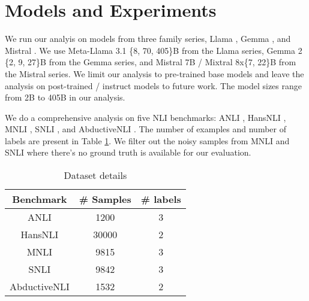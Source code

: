 \section{Models and Experiments}

We run our analyis on models from three family series, Llama \citep{dubey2024llama}, Gemma \citep{team2024gemma}, and Mistral \citep{jiang2023mistral, jiang2024mixtral}. We use Meta-Llama 3.1 \{8, 70, 405\}B from the Llama series, Gemma 2 \{2, 9, 27\}B from the Gemma series, and Mistral 7B / Mixtral 8x\{7, 22\}B from the Mistral series. We limit our analysis to pre-trained base models and leave the analysis on post-trained / instruct models to future work. The model sizes range from 2B to 405B in our analysis.

We do a comprehensive analysis on five NLI benchmarks: ANLI \citep{nie-etal-2020-adversarial}, HansNLI \citep{mccoy-etal-2019-right}, MNLI \citep{williams-etal-2018-broad}, SNLI \citep{bowman-etal-2015-large}, and AbductiveNLI \citep{bhagavatula2020abductive}. The number of examples and number of labels are present in Table \ref{tab:dataset}. We filter out the noisy samples from MNLI and SNLI where there's no ground truth is available for our evaluation.

\begin{table}
  \centering
  \begin{tabular}{c|c|c}
    Benchmark & \# Samples & \# labels \\
    \hline
    ANLI & 1200 & 3 \\
    HansNLI & 30000 & 2 \\
    MNLI & 9815 & 3 \\
    SNLI & 9842 & 3 \\
    AbductiveNLI & 1532 & 2 \\
  \end{tabular}
\caption{Dataset details}
\label{tab:dataset}
\end{table}
